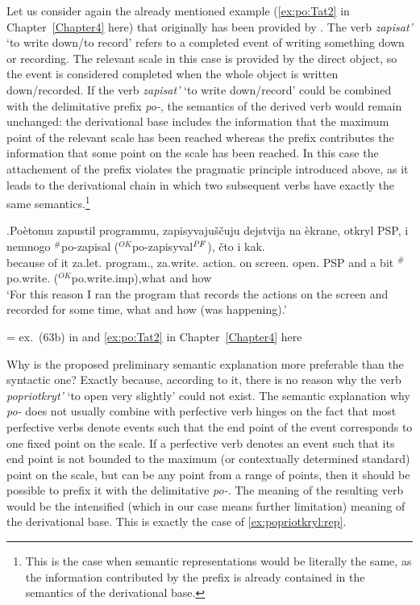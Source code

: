 Let us consider again the already mentioned example (\ref{ex:po:Tat2} in Chapter~\ref{Chapter4} here) that originally has been provided by \citet{Tatevosov:09}. The verb \textit{zapisat'} `to write down/to record' refers to a completed event of writing something down or recording. The relevant scale in this case is provided by the direct object, so the event is considered completed when the whole object is written down/recorded. If the verb \textit{zapisat'} `to write down/record' could be combined with the delimitative prefix \textit{po-}, the semantics of the derived verb would remain unchanged: the derivational base includes the information that the maximum point of the relevant scale has been reached whereas the prefix contributes the information that some point on the scale has been reached. In this case the attachement of the prefix violates the pragmatic principle introduced above, as it leads to the derivational chain in which two subsequent verbs have exactly the same semantics.\footnote{This is the case when semantic representations would be literally the same, as the information contributed by the prefix is already contained in the semantics of the derivational base.}

\exg.\label{ex:po:Tat2:rep}Po\`{e}tomu zapustil programmu, zapisyvaju\v{s}\v{c}uju dejstvija na \`{e}krane, otkryl PSP, i nemnogo $^\#$po-zapisal ($^{\textit{OK}}$po-zapisyval$^{\mathit{PF}}$), \v{c}to i kak.\\
{because of it} za.let. program., za.write. action. on screen. open. PSP and {a bit} $^\#$po.write. ($^{\textit{OK}}$po.write.imp),what and how\\
\vspace{0.5em}
`For this reason I ran the program that records the actions on the screen and recorded for some time, what and how (was happening).'
\begin{flushright}
\vspace{-0.5em}
= ex.~(63b) in \citealt{Tatevosov:09} and \ref{ex:po:Tat2} in Chapter~\ref{Chapter4} here 
\end{flushright}

Why is the proposed preliminary semantic explanation more preferable than the syntactic one? Exactly because, according to it, there is no reason why the verb \textit{popriotkryt'} `to open very slightly' could not exist. The semantic explanation why \textit{po-} does not usually combine with perfective verb hinges on the fact that most perfective verbs denote events such that the end point of the event corresponds to one fixed point on the scale. If a perfective verb denotes an event such that its end point is not bounded to the maximum (or contextually determined standard) point on the scale, but can be any point from a range of points, then it should be possible to prefix it with the delimitative \textit{po-}. The meaning of the resulting verb would be the intensified (which in our case means further limitation) meaning of the derivational base. This is exactly the case of \ref{ex:popriotkryl:rep}.

